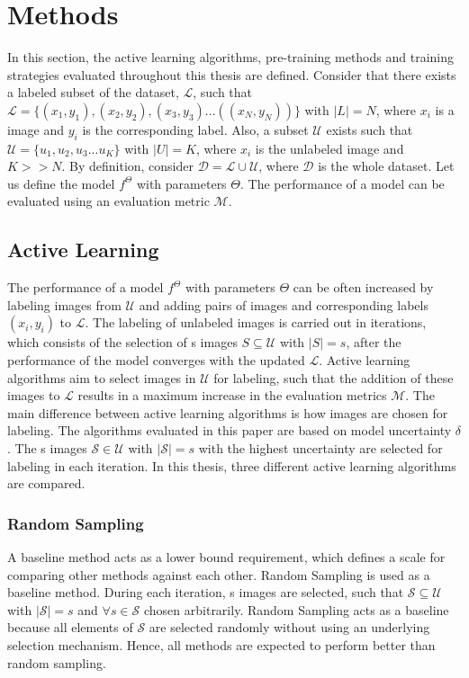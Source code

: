 
\chapter{Methods}\label{chapter:methods}
In this section, the active learning algorithms, pre-training methods and training strategies evaluated throughout this thesis are defined. Consider that there exists a labeled subset of the dataset, $\mathcal{L}$, such that $\mathcal{L} = \{(x_1, y_1), (x_2, y_2), (x_3, y_3) ... ((x_N, y_N))\}$ with $|L| = N$, where $x_i$ is a image and $y_i$ is the corresponding label. Also, a subset $\mathcal{U}$ exists such that $\mathcal{U} = \{u_1, u_2, u_3 ... u_K\}$ with $|U| = K$, where $x_i$ is the unlabeled image and $K>>N$. By definition, consider $\mathcal{D} = \mathcal{L} \cup \mathcal{U}$, where $\mathcal{D}$ is the whole dataset. Let us define the model $f^\Theta$ with parameters $\Theta$. The performance of a model can be evaluated using an evaluation metric $\mathcal{M}$.

\section{Active Learning}\label{section:active_learning}
The performance of a model $f^\Theta$ with parameters $\Theta$ can be often increased \cite{sun2017} by labeling images from $\mathcal{U}$ and adding pairs of images and corresponding labels $(x_i, y_i)$ to $\mathcal{L}$. The labeling of unlabeled images is carried out in iterations, which consists of the selection of s images $S \subseteq \mathcal{U}$ with $|S| = s$, after the performance of the model converges with the updated $\mathcal{L}$. Active learning algorithms aim to select images in $\mathcal{U}$ for labeling, such that the addition of these images to $\mathcal{L}$ results in a maximum increase in the evaluation metrics $\mathcal{M}$. The main difference between active learning algorithms is how images are chosen for labeling. The algorithms evaluated in this paper are based on model uncertainty $\delta$. The s images $\mathcal{S} \in \mathcal{U}$ with $|\mathcal{S}| = s$ with the highest uncertainty are selected for labeling in each iteration. In this thesis, three different active learning algorithms are compared.

\subsection{Random Sampling}
A baseline method acts as a lower bound requirement, which defines a scale for comparing other methods against each other. Random Sampling is used as a baseline method. During each iteration, s images are selected, such that $\mathcal{S} \subseteq \mathcal{U}$ with $|\mathcal{S}| = s$ and $\forall s \in \mathcal{S}$ chosen arbitrarily. Random Sampling acts as a baseline because all elements of $\mathcal{S}$ are selected randomly without using an underlying selection mechanism. Hence, all methods are expected to perform better than random sampling.

